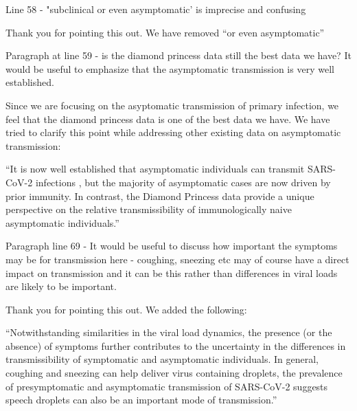 \documentclass[12pt]{article}
\newcommand{\revtext}{\textsf}
\begin{document}
\revtext{Line 58 - "subclinical or even asymptomatic' is imprecise and confusing}

Thank you for pointing this out. We have removed ``or even asymptomatic''

\revtext{Paragraph at line 59 - is the diamond princess data still the best data we have? It would be useful to emphasize that the asymptomatic transmission is very well established.}

Since we are focusing on the asyptomatic transmission of primary infection, we feel that the diamond princess data is one of the best data we have. We have tried to clarify this point while addressing other existing data on asymptomatic transmission: 

``It is now well established that asymptomatic individuals can transmit SARS-CoV-2 infections \citep{gao2021role,johansson2021sars,subramanian2021quantifying,koelle2022changing,lizewski2022navy}, but the majority of asymptomatic cases are now driven by prior immunity.
In contrast, the Diamond Princess data provide a unique perspective on the relative transmissibility of immunologically naive asymptomatic individuals.''

\revtext{Paragraph line 69 - It would be useful to discuss how important the symptoms may be for transmission here - coughing, sneezing etc may of course have a direct impact on transmission and it can be this rather than differences in viral loads are likely to be important.}

Thank you for pointing this out. We added the following:

``Notwithstanding similarities in the viral load dynamics, the presence (or the absence) of symptoms further contributes to the uncertainty in the differences in transmissibility of symptomatic and asymptomatic individuals.
In general, coughing and sneezing can help deliver virus containing droplets, the prevalence of presymptomatic and asymptomatic transmission of SARS-CoV-2 suggests speech droplets can also be an important mode of transmission.''


\end{document}
